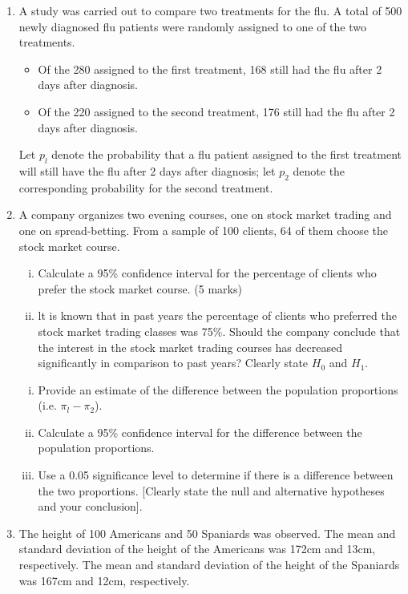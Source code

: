 \documentclass[]{article}
\begin{document}
\begin{enumerate}
\item 
A study was carried out to compare two treatments for the flu. A total of 500
newly diagnosed flu patients were randomly assigned to one of the two treatments.
\begin{itemize}
	\item Of the 280 assigned to the first treatment, 168 still had the flu after 2 days after
	diagnosis. \item Of the 220 assigned to the second treatment, 176 still had the flu after 2
	days after diagnosis. \end{itemize} Let $p_l$ denote the probability that a flu patient assigned to the
first treatment will still have the flu after 2 days after diagnosis; let $p_2$ denote the
corresponding probability for the second treatment.

\item 
A company organizes two evening courses, one on stock market trading and one on
spread-betting. From a sample of 100 clients, 64 of them choose the stock market course.

\begin{enumerate}[(i)]
	\item Calculate a 95\% confidence interval for the percentage of clients who
	prefer the stock market course. (5 marks)
	\item lt is known that in past years the percentage of clients who preferred the
	stock market trading classes was 75\%. Should the company conclude that
	the interest in the stock market trading courses has decreased significantly in
	comparison to past years? Clearly state $H_0$ and $H_1$.
\end{enumerate}

\begin{enumerate}[(i)]
	\item Provide an estimate of the difference between the population
	proportions (i.e. $\pi_l -\pi_2$).
	\item Calculate a 95\% confidence interval for the difference between the
	population proportions.
	\item Use a 0.05 significance level to determine if there is a difference
	between the two proportions. [Clearly state the null and alternative hypotheses
	and your conclusion].
\end{enumerate}

\item 
The height of 100 Americans and 50 Spaniards was observed. The mean and
standard deviation of the height of the Americans was 172cm and 13cm,
respectively. The mean and standard deviation of the height of the Spaniards
was 167cm and 12cm, respectively.


\end{enumerate}
\end{document}
